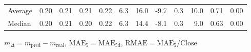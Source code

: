 \begin{threeparttable}
{\begin{tabular}{lrrrrrrrrrrr}
Average &          0.20 &          0.21 &          0.21 &        0.22 &                 6.3 &                16.0 &       -9.7 &                 0.3 &             10.0 &            0.71 &                   0.00 \\
 Median &          0.20 &          0.21 &          0.20 &        0.22 &                 6.3 &                14.4 &       -8.1 &                 0.3 &              9.0 &            0.63 &                   0.00 \\
\bottomrule
\end{tabular}
}
\begin{tablenotes}\footnotesize
\item $m_\Delta=m_{\text{pred}}-m_{\text{real}}$,
$\mathrm{MAE}_5=\mathrm{MAE}_{5\text{d}}$,
$\mathrm{RMAE}=\mathrm{MAE}_5/\text{Close}$
\end{tablenotes}
\end{threeparttable}
\endgroup

